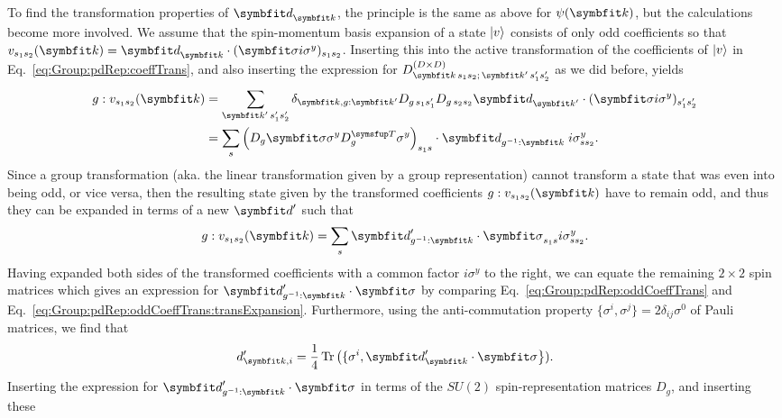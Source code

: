 To find the transformation properties of $\v{d}_\v{k}$, the principle is the same as above for $\psi(\v{k})$, but the calculations become more involved.
We assume that the spin-momentum basis expansion of a state $\lvert v \rangle$ consists of only odd coefficients so that
$v_{s_1s_2}(\v{k}) = \v{d}_\v{k}\cdot(\v{\sigma}i\sigma^y)_{s_1s_2}$. Inserting this into the active transformation of the coefficients of $\lvert v \rangle$ in
Eq.~\eqref{eq:Group:pdRep:coeffTrans}, and also inserting the expression for $D^{(D\times D)}_{\v{k}\,s_1s_2;\,\v{k}'\,s_1's_2'}$ as we did before, yields
\begin{equation}
    \label{eq:Group:pdRep:oddCoeffTrans}
    \begin{split}
        g:v_{s_1s_2}(\v{k}) &= \sum_{\v{k}'\,s_1's_2'}\delta_{\v{k},g:\v{k}'}D_{g\,s_1s_1'}D_{g\,s_2s_2}\v{d}_{\v{k}'}\cdot(\v{\sigma}i\sigma^y)_{s_1's_2'}\\
        &= \sum_s\Big(D_g\v{\sigma}\sigma^yD_g^\trans\sigma^y\Big)_{s_1s}\cdot\v{d}_{g^{-1}:\v{k}}\;i\sigma^y_{ss_2}.
    \end{split}
\end{equation}
Since a group transformation (aka. the linear transformation given by a group representation) cannot transform a state that was even into being odd, or vice versa,
then the resulting state given by the transformed coefficients $g:v_{s_1s_2}(\v{k})$ have to remain odd, and thus they can be expanded in terms of a new
$\v{d}'$ such that 
\begin{equation}
    \label{eq:Group:pdRep:oddCoeffTrans:transExpansion}
    g:v_{s_1s_2}(\v{k}) = \sum_s\v{d}'_{g^{-1}:\v{k}}\cdot\v{\sigma}_{s_1s}i\sigma^y_{ss_2}.
\end{equation}
Having expanded both sides of the transformed coefficients with a common factor $i\sigma^y$ to the right, we can equate the remaining $2\times2$ spin
matrices which gives an expression for $\v{d}'_{g^{-1}:\v{k}}\cdot\v{\sigma}$ by comparing Eq.~\eqref{eq:Group:pdRep:oddCoeffTrans} and
Eq.~\eqref{eq:Group:pdRep:oddCoeffTrans:transExpansion}.
Furthermore, using the anti-commutation property $\{\sigma^i,\sigma^j\} = 2\delta_{ij}\sigma^0$ of Pauli matrices, we find that
\begin{equation}
    \label{eq:Group:pdRep:projectingD}
    d'_{\v{k},i} = \frac{1}{4}\tr\big(\{\sigma^i, \v{d}'_\v{k}\cdot\v{\sigma}\big\}).
\end{equation}
Inserting the expression for $\v{d}'_{g^{-1}:\v{k}}\cdot\v{\sigma}$ in terms of the $SU(2)$ spin-representation matrices $D_g$, and inserting these
